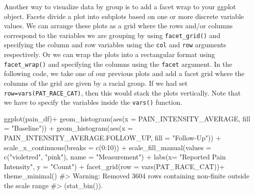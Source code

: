 \documentclass[
  letterpaper,
]{latex/krantz}
\makeatletter
\newenvironment{Shaded}{\begin{snugshade}}{\end{snugshade}}
\newcommand{\AttributeTok}[1]{\textcolor[rgb]{0.40,0.45,0.13}{#1}}
\newcommand{\CommentTok}[1]{\textcolor[rgb]{0.37,0.37,0.37}{#1}}
\newcommand{\DecValTok}[1]{\textcolor[rgb]{0.68,0.00,0.00}{#1}}
\newcommand{\FunctionTok}[1]{\textcolor[rgb]{0.28,0.35,0.67}{#1}}
\newcommand{\NormalTok}[1]{\textcolor[rgb]{0.00,0.23,0.31}{#1}}
\newcommand{\SpecialCharTok}[1]{\textcolor[rgb]{0.37,0.37,0.37}{#1}}
\newcommand{\StringTok}[1]{\textcolor[rgb]{0.13,0.47,0.30}{#1}}
\newenvironment{kframe}{%
\medskip{}
\setlength{\fboxsep}{.8em}
 \def\at@end@of@kframe{}%
 \ifinner\ifhmode%
  \def\at@end@of@kframe{\end{minipage}}%
  \begin{minipage}{\columnwidth}%
 \fi\fi%
 \def\FrameCommand##1{\hskip\@totalleftmargin \hskip-\fboxsep
 \colorbox{shadecolor}{##1}\hskip-\fboxsep
     \hskip-\linewidth \hskip-\@totalleftmargin \hskip\columnwidth}%
 \MakeFramed {\advance\hsize-\width
   \@totalleftmargin\z@ \linewidth\hsize
   \@setminipage}}%
 {\par\unskip\endMakeFramed%
 \at@end@of@kframe}
\renewenvironment{Shaded}{\begin{kframe}}{\end{kframe}}
\makeatother
\begin{document}
Another way to visualize data by group is to add a facet wrap to your
ggplot object. Facets divide a plot into subplots
based on one or more discrete variable values. We can arrange these
plots as a grid where the rows and/or columns correspond to the
variables we are grouping by using
\texttt{facet\_grid()}
and specifying the column and row variables using the \texttt{col} and
\texttt{row} arguments respectively. Or we can wrap the plots into a
rectangular format using
\texttt{facet\_wrap()}
and specifying the columns using the \texttt{facet} argument. In the
following code, we take one of our previous plots and add a facet grid
where the columns of the grid are given by a racial group. If we had set
\texttt{row=vars(PAT\_RACE\_CAT)}, then this would stack the plots
vertically. Note that we have to specify the variables inside the
\texttt{vars()} function.

\begin{Shaded}
\begin{Highlighting}[]
\FunctionTok{ggplot}\NormalTok{(pain\_df)}\SpecialCharTok{+}
  \FunctionTok{geom\_histogram}\NormalTok{(}\FunctionTok{aes}\NormalTok{(}\AttributeTok{x =}\NormalTok{ PAIN\_INTENSITY\_AVERAGE, }\AttributeTok{fill =} \StringTok{"Baseline"}\NormalTok{)) }\SpecialCharTok{+}
  \FunctionTok{geom\_histogram}\NormalTok{(}\FunctionTok{aes}\NormalTok{(}\AttributeTok{x =}\NormalTok{ PAIN\_INTENSITY\_AVERAGE.FOLLOW\_UP, }
                     \AttributeTok{fill =} \StringTok{"Follow{-}Up"}\NormalTok{)) }\SpecialCharTok{+}
  \FunctionTok{scale\_x\_continuous}\NormalTok{(}\AttributeTok{breaks =} \FunctionTok{c}\NormalTok{(}\DecValTok{0}\SpecialCharTok{:}\DecValTok{10}\NormalTok{)) }\SpecialCharTok{+} 
  \FunctionTok{scale\_fill\_manual}\NormalTok{(}\AttributeTok{values =} \FunctionTok{c}\NormalTok{(}\StringTok{"violetred"}\NormalTok{, }\StringTok{"pink"}\NormalTok{), }
                    \AttributeTok{name =} \StringTok{"Measurement"}\NormalTok{) }\SpecialCharTok{+}
  \FunctionTok{labs}\NormalTok{(}\AttributeTok{x=} \StringTok{"Reported Pain Intensity"}\NormalTok{, }\AttributeTok{y =} \StringTok{"Count"}\NormalTok{) }\SpecialCharTok{+}
  \FunctionTok{facet\_grid}\NormalTok{(}\AttributeTok{row =} \FunctionTok{vars}\NormalTok{(PAT\_RACE\_CAT))}\SpecialCharTok{+}
  \FunctionTok{theme\_minimal}\NormalTok{()}
\CommentTok{\#\textgreater{} Warning: Removed 3604 rows containing non{-}finite outside the scale range}
\CommentTok{\#\textgreater{} (\textasciigrave{}stat\_bin()\textasciigrave{}).}
\end{Highlighting}
\end{Shaded}
\end{document}
